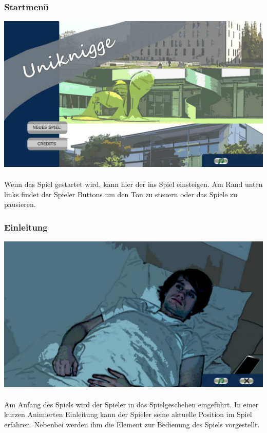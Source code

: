 \documentclass[a4paper, 11pt]{article} %
\begin{document}
\subsubsection{Startmenü}
\includegraphics[scale=0.46]{images/spiel/startmenue.png}\\\\
Wenn das Spiel gestartet wird, kann hier der ins Spiel einsteigen. Am Rand unten links findet der Spieler Buttons um den Ton zu steuern oder das Spiele zu pausieren.

\subsubsection{Einleitung}
\includegraphics[scale=0.46]{images/spiel/intro.png}\\\\
Am Anfang des Spiels wird der Spieler in das Spielgeschehen eingeführt. In einer kurzen Animierten Einleitung kann der Spieler seine aktuelle Position im Spiel erfahren. Nebenbei werden ihm die Element zur Bedienung des Spiels vorgestellt.
\end{document}

